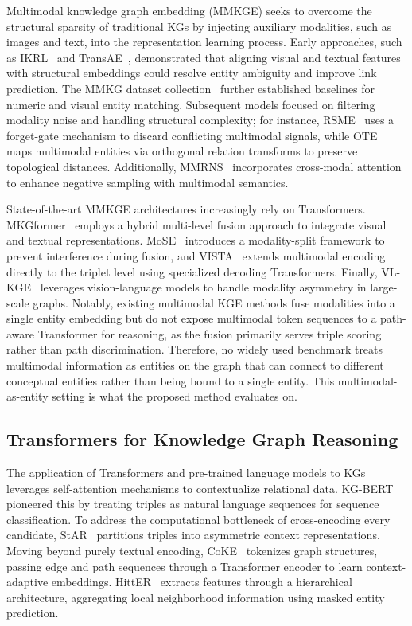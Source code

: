 \documentclass[runningheads]{llncs}
\begin{document}
Multimodal knowledge graph embedding (MMKGE) seeks to overcome the structural sparsity of traditional KGs by injecting auxiliary modalities, such as images and text, into the representation learning process. Early approaches, such as IKRL~\cite{xie2017image} and TransAE~\cite{wang2019transae}, demonstrated that aligning visual and textual features with structural embeddings could resolve entity ambiguity and improve link prediction. The MMKG dataset collection~\cite{liu2019mmkg} further established baselines for numeric and visual entity matching. Subsequent models focused on filtering modality noise and handling structural complexity; for instance, RSME~\cite{wang2021rsme} uses a forget-gate mechanism to discard conflicting multimodal signals, while OTE~\cite{tang2020orthogonal} maps multimodal entities via orthogonal relation transforms to preserve topological distances. Additionally, MMRNS~\cite{xu2022multimodal} incorporates cross-modal attention to enhance negative sampling with multimodal semantics.

State-of-the-art MMKGE architectures increasingly rely on Transformers. MKGformer~\cite{chen2022mkgformer} employs a hybrid multi-level fusion approach to integrate visual and textual representations. MoSE~\cite{zhao2022mose} introduces a modality-split framework to prevent interference during fusion, and VISTA~\cite{lee2023vista} extends multimodal encoding directly to the triplet level using specialized decoding Transformers. Finally, VL-KGE~\cite{efthymiou2026vlkge} leverages vision-language models to handle modality asymmetry in large-scale graphs. Notably, existing multimodal KGE methods fuse modalities into a single entity embedding but do not expose multimodal token sequences to a path-aware Transformer for reasoning, as the fusion primarily serves triple scoring rather than path discrimination. Therefore, no widely used benchmark treats multimodal information as entities on the graph that can connect to different conceptual entities rather than being bound to a single entity. This multimodal-as-entity setting is what the proposed method evaluates on.

\subsection{Transformers for Knowledge Graph Reasoning}
\label{sec:rw-transformers}

The application of Transformers and pre-trained language models to KGs leverages self-attention mechanisms to contextualize relational data. KG-BERT~\cite{yao2019kg} pioneered this by treating triples as natural language sequences for sequence classification. To address the computational bottleneck of cross-encoding every candidate, StAR~\cite{wang2021star} partitions triples into asymmetric context representations. Moving beyond purely textual encoding, CoKE~\cite{wang2019coke} tokenizes graph structures, passing edge and path sequences through a Transformer encoder to learn context-adaptive embeddings. HittER~\cite{chen2021hitter} extracts features through a hierarchical architecture, aggregating local neighborhood information using masked entity prediction.
\end{document}
